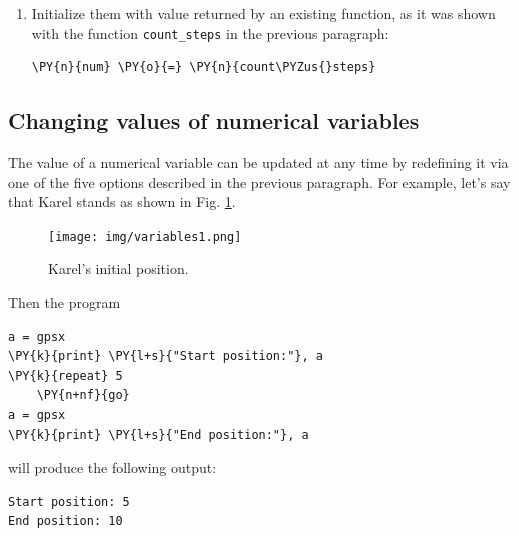 \begin{enumerate}
\noindent
\item Initialize them with value returned by an existing function, as it was shown 
with the function {\tt count\_steps} in the previous paragraph:\\[-6mm]

\begin{bbox}
\begin{Verbatim}[commandchars=\\\{\}]
\PY{n}{num} \PY{o}{=} \PY{n}{count\PYZus{}steps}
\end{Verbatim}
\end{bbox}
\end{enumerate}

\subsection[\ \ Changing values of numerical variables]{Changing values of numerical variables}

The value of a numerical variable can be updated at any time by redefining it via 
one of the five options described in the previous paragraph. For example, let's say that 
Karel stands as shown in Fig. \ref{fig:var1}.
\newpage

\begin{figure}[!ht]
\begin{center}
\texttt{[image: img/variables1.png]}
\end{center}
\vspace{-4mm}
\caption{Karel's initial position.}
\label{fig:var1}
\end{figure}
\noindent
Then the program\\

\begin{bbox}
\begin{Verbatim}[commandchars=\\\{\}]
a = gpsx
\PY{k}{print} \PY{l+s}{"Start position:"}, a
\PY{k}{repeat} 5
    \PY{n+nf}{go}
a = gpsx 
\PY{k}{print} \PY{l+s}{"End position:"}, a
\end{Verbatim}
\end{bbox}
\vspace{6mm}

\noindent
will produce the following output:\\

\begin{ybox}
\begin{verbatim}
Start position: 5
End position: 10
\end{verbatim}
\end{ybox}
\vspace{6mm}

